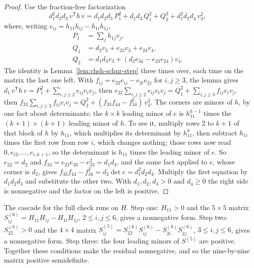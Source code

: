 \documentclass[11pt,twoside]{article}
\theoremstyle{thielethm}
\theoremstyle{thieledef}
\theoremstyle{thieledef}
\theoremstyle{thieledef}
\theoremstyle{thielethm}
\theoremstyle{thieleobs}
\theoremstyle{thielethm}
\begin{document}
\begin{proof}
Use the fraction-free factorization
\[
d_1^2 d_2 d_3 \, v^{\mathsf T} h\, v = d_1 d_2 d_3 \, P_1^2 + d_1 d_3 \, Q_1^2 + Q_2^2 +
d_1^2 d_2 d_4 \, v_4^2,
\]
where, writing $e_{ij}=h_{11}h_{ij}-h_{1i}h_{1j}$,
\[
\begin{aligned}
P_1 &= \sum_j h_{1j}v_j,\\
Q_1 &= d_2v_2+e_{23}v_3+e_{24}v_4,\\
Q_2 &= d_1d_3v_3+(d_2e_{34}-e_{23}e_{24})v_4.
\end{aligned}
\]
The identity is Lemma~\ref{lem:chsh-schur-step} three times over, each time on the matrix the
last one left. With $f_{ij}=e_{22}e_{ij}-e_{2i}e_{2j}$ for $i,j\ge3$, the lemma gives
$d_1\,v^{\mathsf T}h\,v = P_1^2+\sum_{i,j\ge2}e_{ij}v_iv_j$, then
$e_{22}\sum_{i,j\ge2}e_{ij}v_iv_j = Q_1^2+\sum_{i,j\ge3}f_{ij}v_iv_j$, then
$f_{33}\sum_{i,j\ge3}f_{ij}v_iv_j = Q_2^2+(f_{33}f_{44}-f_{34}^2)\,v_4^2$. The corners are
minors of $h$, by one fact about determinants: the $k\times k$ leading minor of $e$ is
$h_{11}^{k-1}$ times the $(k+1)\times(k+1)$ leading minor of $h$. To see it, multiply rows 2 to
$k+1$ of that block of $h$ by $h_{11}$, which multiplies its determinant by $h_{11}^k$, then
subtract $h_{1i}$ times the first row from row $i$, which changes nothing; those rows now read
$0, e_{i2}, \ldots, e_{i,k+1}$, so the determinant is $h_{11}$ times the leading minor of $e$.
So $e_{22}=d_2$ and $f_{33}=e_{22}e_{33}-e_{23}^2=d_1d_3$, and the same fact applied to $e$,
whose corner is $d_2$, gives $f_{33}f_{44}-f_{34}^2=d_2\det e=d_1^2d_2d_4$. Multiply the first
equation by $d_1d_2d_3$ and substitute the other two. With $d_1, d_2, d_3 > 0$ and $d_4 \ge 0$ the right side is nonnegative and the factor on the left is positive.
\end{proof}

The cascade for the full check runs on $H$. Step one: $H_{11} > 0$ and the $5 \times 5$
matrix $S^{(6)}_{ij} = H_{11} H_{ij} - H_{1i} H_{1j}$, $2 \le i, j \le 6$, gives a nonnegative
form. Step two: $S^{(6)}_{22} > 0$ and the $4 \times 4$ matrix
$S^{(5)}_{ij} = S^{(6)}_{22} S^{(6)}_{ij} - S^{(6)}_{2i} S^{(6)}_{2j}$, $3 \le i, j \le 6$,
gives a nonnegative form. Step three: the four leading minors of $S^{(5)}$ are positive. Together these conditions make the residual nonnegative, and so the nine-by-nine matrix positive semidefinite.
\end{document}
